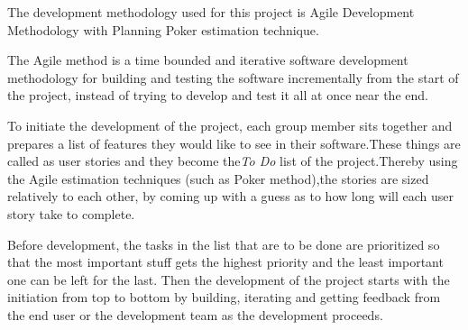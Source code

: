The development methodology used for this project is Agile Development Methodology with Planning Poker estimation technique.

The Agile method is a time bounded and iterative software development methodology for building and testing the software incrementally from the start of the project, instead of trying to develop and test it all at once near the end.

To initiate the development of the project, each group member sits together and prepares a list of features they would like to see in their software.These things are called as user stories and they become the\emph{To Do} list of the project.Thereby using the Agile estimation techniques (such as Poker method),the stories are sized relatively to each other, by coming up with a guess as to how long will each user story take to complete. 

Before development, the tasks in the list that are to be done are prioritized  so that the most important stuff gets the highest priority and the least important one can be left for the last.
Then the development of the project starts with the initiation from top to bottom by building, iterating and getting feedback from the end user or the development team as the development proceeds.